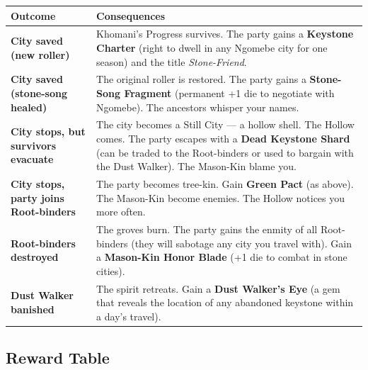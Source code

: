 \begin{tcolorbox}[colback=black!3,colframe=green!60!black,title={The Nine Rollers: A City on the Edge},breakable]
  \begin{longtable}{|p{}|p{}|}
  \hline
  \textbf{Outcome} & \textbf{Consequences} \\
  \hline
  \textbf{City saved (new roller)} & Khomani's Progress survives. The party gains a \textbf{Keystone Charter} (right to dwell in any Ngomebe city for one season) and the title \textit{Stone-Friend}. \\
  \hline
  \textbf{City saved (stone-song healed)} & The original roller is restored. The party gains a \textbf{Stone-Song Fragment} (permanent +1 die to negotiate with Ngomebe). The ancestors whisper your names. \\
  \hline
  \textbf{City stops, but survivors evacuate} & The city becomes a Still City --- a hollow shell. The Hollow comes. The party escapes with a \textbf{Dead Keystone Shard} (can be traded to the Root-binders or used to bargain with the Dust Walker). The Mason-Kin blame you. \\
  \hline
  \textbf{City stops, party joins Root-binders} & The party becomes tree-kin. Gain \textbf{Green Pact} (as above). The Mason-Kin become enemies. The Hollow notices you more often. \\
  \hline
  \textbf{Root-binders destroyed} & The groves burn. The party gains the enmity of all Root-binders (they will sabotage any city you travel with). Gain a \textbf{Mason-Kin Honor Blade} (+1 die to combat in stone cities). \\
  \hline
  \textbf{Dust Walker banished} & The spirit retreats. Gain a \textbf{Dust Walker's Eye} (a gem that reveals the location of any abandoned keystone within a day's travel). \\
  \hline
  \end{longtable}
  
  \vspace{2mm}
  \subsection*{Reward Table}
  

\end{tcolorbox}
